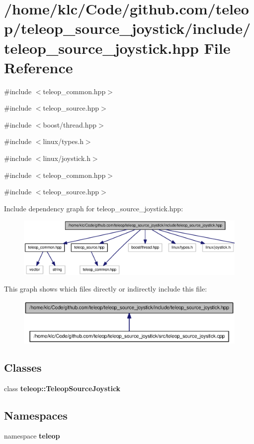 \section{/home/klc/Code/github.com/teleop/teleop\_\-source\_\-joystick/include/teleop\_\-source\_\-joystick.hpp File Reference}
\label{teleop__source__joystick_8hpp}
{\ttfamily \#include $<$teleop\_\-common.hpp$>$}\par
{\ttfamily \#include $<$teleop\_\-source.hpp$>$}\par
{\ttfamily \#include $<$boost/thread.hpp$>$}\par
{\ttfamily \#include $<$linux/types.h$>$}\par
{\ttfamily \#include $<$linux/joystick.h$>$}\par
{\ttfamily \#include $<$teleop\_\-common.hpp$>$}\par
{\ttfamily \#include $<$teleop\_\-source.hpp$>$}\par
Include dependency graph for teleop\_\-source\_\-joystick.hpp:
\nopagebreak
\begin{figure}[H]
\begin{center}
\leavevmode
\includegraphics[width=400pt]{teleop__source__joystick_8hpp__incl}
\end{center}
\end{figure}
This graph shows which files directly or indirectly include this file:
\nopagebreak
\begin{figure}[H]
\begin{center}
\leavevmode
\includegraphics[width=400pt]{teleop__source__joystick_8hpp__dep__incl}
\end{center}
\end{figure}
\subsection*{Classes}
\begin{DoxyCompactItemize}
\item 
class {\bf teleop::TeleopSourceJoystick}
\end{DoxyCompactItemize}
\subsection*{Namespaces}
\begin{DoxyCompactItemize}
\item 
namespace {\bf teleop}
\end{DoxyCompactItemize}
